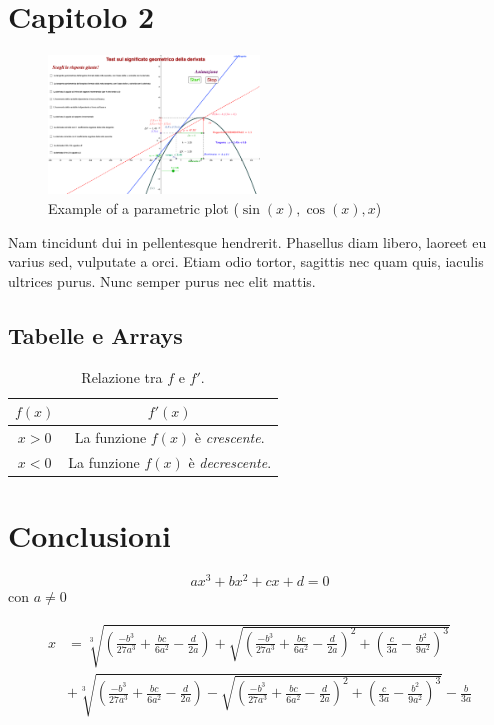 \documentclass[11pt, landscape]{article}
\begin{document}


\section{Capitolo 2}
\begin{figure}[h!]

\includegraphics[width=0.5\textwidth]{Derivata}
\caption{Example of a parametric plot ($\sin (x), \cos(x), x$)}
\end{figure}
\noindent
Nam tincidunt dui in pellentesque hendrerit. Phasellus diam libero, laoreet eu varius sed, vulputate a orci. Etiam odio tortor, sagittis nec quam quis, iaculis ultrices purus. Nunc semper purus nec elit mattis.\\



	\subsection{Tabelle e Arrays}
	\begin{table}[H]
	\centering
	\caption{Relazione tra $f$ e $f'$.}
	\def\arraystretch{1.5}
	\begin{tabular}{|c|c|} %
	\hline
	$f(x)$ & $f'(x)$\\ \hline
	$x>0$ & La funzione $f(x)$ è \emph{crescente}. \\
	\hline
	$x<0$ & La funzione $f(x)$ è \emph{decrescente}. \\
	\hline		
	\end{tabular}
		
	\end{table}
\section{Conclusioni}
\[ax^3 + bx^2 + cx + d = 0 \]con \(a \neq 0\)

\begin{align}
x &=\sqrt[3]{\left(\frac{-b^{3}}{27 a^{3}}+\frac{b c}{6 a^{2}}-\frac{d}{2 a}\right)+\sqrt{\left(\frac{-b^{3}}{27 a^{3}}+\frac{b c}{6 a^{2}}-\frac{d}{2 a}\right)^{2}+\left(\frac{c}{3 a}-\frac{b^{2}}{9 a^{2}}\right)^{3}}}\\
&+\sqrt[3]{\left(\frac{-b^{3}}{27 a^{3}}+\frac{b c}{6 a^{2}}-\frac{d}{2 a}\right)-\sqrt{\left(\frac{-b^{3}}{27 a^{3}}+\frac{b c}{6 a^{2}}-\frac{d}{2 a}\right)^{2}+\left(\frac{c}{3 a}-\frac{b^{2}}{9 a^{2}}\right)^{3}}}-\frac{b}{3 a}
\end{align}
\end{document}

